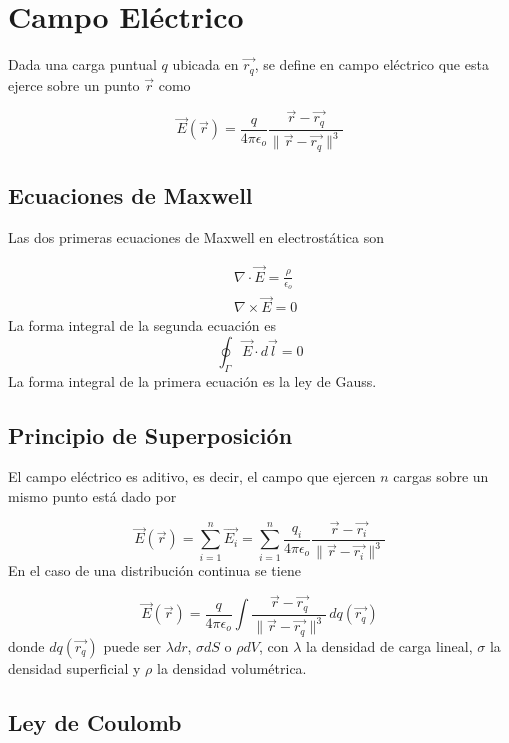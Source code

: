 \section{Campo Eléctrico}

Dada una carga puntual $q$ ubicada en $\Vec{r_q}$, se define en campo eléctrico que esta ejerce sobre un punto $\Vec{r}$ como

\[\Vec{E}(\Vec{r}) = \frac{q}{4\pi\epsilon_o}\frac{\Vec{r}-\Vec{r_q}}{\parallel\Vec{r}-\Vec{r_q}\parallel^3}\]

\subsection{Ecuaciones de Maxwell}

Las dos primeras ecuaciones de Maxwell en electrostática son

\begin{equation}
\begin{split}
    &\nabla\cdot\Vec{E}=\frac{\rho}{\epsilon_o}\\
    &\nabla\times\Vec{E}=0
\end{split}
\nonumber
\end{equation}
\bigbreak
La forma integral de la segunda ecuación es
\[\oint_{\Gamma}\Vec{E}\cdot d\Vec{l} = 0\]
\bigbreak
La forma integral de la primera ecuación es la ley de Gauss.

\subsection{Principio de Superposición}

El campo eléctrico es aditivo, es decir, el campo que ejercen $n$ cargas sobre un mismo punto está dado por

\[\Vec{E}(\Vec{r}) = \sum^n_{i=1}\Vec{E_i} = \sum^n_{i=1}\frac{q_i}{4\pi\epsilon_o}\frac{\Vec{r}-\Vec{r_i}}{\parallel\Vec{r}-\Vec{r_i}\parallel^3}\]
\bigbreak
En el caso de una distribución continua se tiene

\[\Vec{E}(\Vec{r}) = \frac{q}{4\pi\epsilon_o}\int\frac{\Vec{r}-\Vec{r_q}}{\parallel\Vec{r}-\Vec{r_q}\parallel^3}\,dq(\Vec{r_q})\]
\bigbreak
donde $dq(\Vec{r_q})$ puede ser $\lambda dr$, $\sigma dS$ o $\rho dV$, con $\lambda$ la densidad de carga lineal, $\sigma$ la densidad superficial y $\rho$ la densidad volumétrica.

\subsection{Ley de Coulomb}

